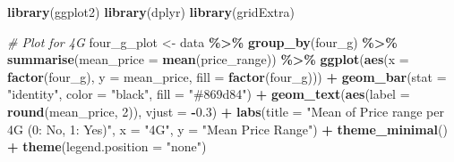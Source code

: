 \documentclass[
]{article}
\newenvironment{Shaded}{\begin{snugshade}}{\end{snugshade}}
\newcommand{\AttributeTok}[1]{\textcolor[rgb]{0.13,0.29,0.53}{#1}}
\newcommand{\CommentTok}[1]{\textcolor[rgb]{0.56,0.35,0.01}{\textit{#1}}}
\newcommand{\DecValTok}[1]{\textcolor[rgb]{0.00,0.00,0.81}{#1}}
\newcommand{\FloatTok}[1]{\textcolor[rgb]{0.00,0.00,0.81}{#1}}
\newcommand{\FunctionTok}[1]{\textcolor[rgb]{0.13,0.29,0.53}{\textbf{#1}}}
\newcommand{\NormalTok}[1]{#1}
\newcommand{\OtherTok}[1]{\textcolor[rgb]{0.56,0.35,0.01}{#1}}
\newcommand{\SpecialCharTok}[1]{\textcolor[rgb]{0.81,0.36,0.00}{\textbf{#1}}}
\newcommand{\StringTok}[1]{\textcolor[rgb]{0.31,0.60,0.02}{#1}}
\begin{document}
\begin{Shaded}
\begin{Highlighting}[]
\FunctionTok{library}\NormalTok{(ggplot2)}
\FunctionTok{library}\NormalTok{(dplyr)}
\FunctionTok{library}\NormalTok{(gridExtra)}

\CommentTok{\# Plot for 4G}
\NormalTok{four\_g\_plot }\OtherTok{\textless{}{-}}\NormalTok{ data }\SpecialCharTok{\%\textgreater{}\%}
  \FunctionTok{group\_by}\NormalTok{(four\_g) }\SpecialCharTok{\%\textgreater{}\%}
  \FunctionTok{summarise}\NormalTok{(}\AttributeTok{mean\_price =} \FunctionTok{mean}\NormalTok{(price\_range)) }\SpecialCharTok{\%\textgreater{}\%}
  \FunctionTok{ggplot}\NormalTok{(}\FunctionTok{aes}\NormalTok{(}\AttributeTok{x =} \FunctionTok{factor}\NormalTok{(four\_g), }\AttributeTok{y =}\NormalTok{ mean\_price, }\AttributeTok{fill =} \FunctionTok{factor}\NormalTok{(four\_g))) }\SpecialCharTok{+}
  \FunctionTok{geom\_bar}\NormalTok{(}\AttributeTok{stat =} \StringTok{"identity"}\NormalTok{, }\AttributeTok{color =} \StringTok{"black"}\NormalTok{, }\AttributeTok{fill =} \StringTok{"\#869d84"}\NormalTok{) }\SpecialCharTok{+}
  \FunctionTok{geom\_text}\NormalTok{(}\FunctionTok{aes}\NormalTok{(}\AttributeTok{label =} \FunctionTok{round}\NormalTok{(mean\_price, }\DecValTok{2}\NormalTok{)), }\AttributeTok{vjust =} \SpecialCharTok{{-}}\FloatTok{0.3}\NormalTok{) }\SpecialCharTok{+}
  \FunctionTok{labs}\NormalTok{(}\AttributeTok{title =} \StringTok{"Mean of Price range per 4G (0: No, 1: Yes)"}\NormalTok{, }\AttributeTok{x =} \StringTok{"4G"}\NormalTok{, }\AttributeTok{y =} \StringTok{"Mean Price Range"}\NormalTok{) }\SpecialCharTok{+}
  \FunctionTok{theme\_minimal}\NormalTok{() }\SpecialCharTok{+}
  \FunctionTok{theme}\NormalTok{(}\AttributeTok{legend.position =} \StringTok{"none"}\NormalTok{)}


\end{Highlighting}
\end{Shaded}
\end{document}
